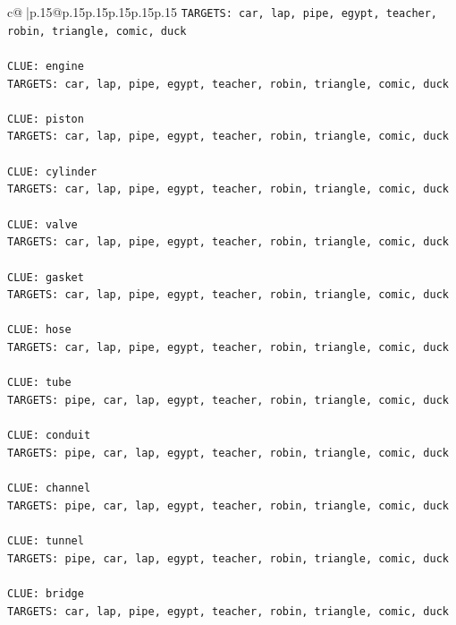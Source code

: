 \documentclass{article}
\begin{document}
{\begin{supertabular}{c@{$\;$}|p{.15\linewidth}@{}p{.15\linewidth}p{.15\linewidth}p{.15\linewidth}p{.15\linewidth}p{.15\linewidth}}
{{{\texttt{TARGETS: car, lap, pipe, egypt, teacher, robin, triangle, comic, duck} \\
\\ 
\texttt{CLUE: engine} \\
\texttt{TARGETS: car, lap, pipe, egypt, teacher, robin, triangle, comic, duck} \\
\\ 
\texttt{CLUE: piston} \\
\texttt{TARGETS: car, lap, pipe, egypt, teacher, robin, triangle, comic, duck} \\
\\ 
\texttt{CLUE: cylinder} \\
\texttt{TARGETS: car, lap, pipe, egypt, teacher, robin, triangle, comic, duck} \\
\\ 
\texttt{CLUE: valve} \\
\texttt{TARGETS: car, lap, pipe, egypt, teacher, robin, triangle, comic, duck} \\
\\ 
\texttt{CLUE: gasket} \\
\texttt{TARGETS: car, lap, pipe, egypt, teacher, robin, triangle, comic, duck} \\
\\ 
\texttt{CLUE: hose} \\
\texttt{TARGETS: car, lap, pipe, egypt, teacher, robin, triangle, comic, duck} \\
\\ 
\texttt{CLUE: tube} \\
\texttt{TARGETS: pipe, car, lap, egypt, teacher, robin, triangle, comic, duck} \\
\\ 
\texttt{CLUE: conduit} \\
\texttt{TARGETS: pipe, car, lap, egypt, teacher, robin, triangle, comic, duck} \\
\\ 
\texttt{CLUE: channel} \\
\texttt{TARGETS: pipe, car, lap, egypt, teacher, robin, triangle, comic, duck} \\
\\ 
\texttt{CLUE: tunnel} \\
\texttt{TARGETS: pipe, car, lap, egypt, teacher, robin, triangle, comic, duck} \\
\\ 
\texttt{CLUE: bridge} \\
\texttt{TARGETS: car, lap, pipe, egypt, teacher, robin, triangle, comic, duck} \\
}}}
\end{supertabular}}
\end{document}

